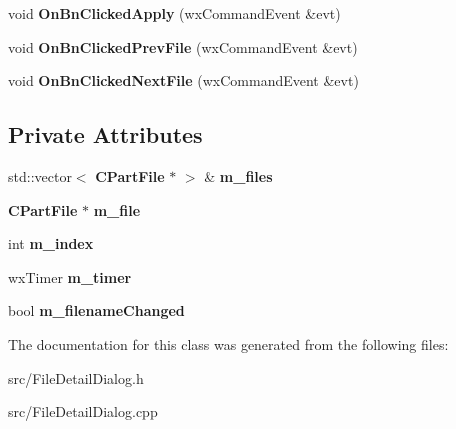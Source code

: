 \begin{DoxyCompactItemize}
\item 
void {\bfseries OnBnClickedApply} (wxCommandEvent \&evt)\label{classCFileDetailDialog_a4df536b810bd65add78ece5c13445767}

\item 
void {\bfseries OnBnClickedPrevFile} (wxCommandEvent \&evt)\label{classCFileDetailDialog_a56f95631948e593d2cca9c50570ecf7e}

\item 
void {\bfseries OnBnClickedNextFile} (wxCommandEvent \&evt)\label{classCFileDetailDialog_a8d3e895706faf45c12b498affff5eafe}

\end{DoxyCompactItemize}
\subsection*{Private Attributes}
\begin{DoxyCompactItemize}
\item 
std::vector$<$ {\bf CPartFile} $\ast$ $>$ \& {\bfseries m\_\-files}\label{classCFileDetailDialog_a032584808e641ce61016444beea535e8}

\item 
{\bf CPartFile} $\ast$ {\bfseries m\_\-file}\label{classCFileDetailDialog_a39f9bb5ccdddf3ab5f3cd2d00e2fd6f2}

\item 
int {\bfseries m\_\-index}\label{classCFileDetailDialog_a9b1d8ed85b0f5e2fc2a1abbce392f9e4}

\item 
wxTimer {\bfseries m\_\-timer}\label{classCFileDetailDialog_a3ea0acb690767692fd1ee40b95c435ba}

\item 
bool {\bfseries m\_\-filenameChanged}\label{classCFileDetailDialog_ab38c58cf09eff195c25662cbf5ba8763}

\end{DoxyCompactItemize}


The documentation for this class was generated from the following files:\begin{DoxyCompactItemize}
\item 
src/FileDetailDialog.h\item 
src/FileDetailDialog.cpp\end{DoxyCompactItemize}
